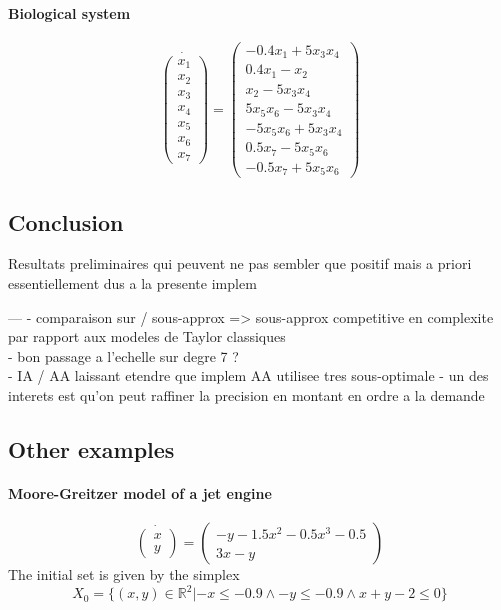 \documentclass{sig-alternate-05-2015} %
\newcommand\ForAuthors[1]%
 {\par\smallskip                     %
  \begin{center}%
   \fbox%
   {\parbox{0.9\linewidth}%
    {\raggedright\sc--- #1}%
   }%
  \end{center}%
  \par\smallskip                     %
 }
\def\R{{\mathbb R}}
\begin{document}
\paragraph{Biological system}


\begin{equation}
\dot{\left(\begin{array}{c}
x_1 \\
x_2 \\
x_3 \\
x_4 \\
x_5 \\
x_6 \\
x_7
\end{array}\right)} = \left(\begin{array}{c}
-0.4x_1+5x_3x_4 \\
0.4x_1-x_2 \\
x_2-5x_3x_4 \\
5x_5x_6-5x_3x_4 \\
-5x_5x_6+5x_3x_4 \\
0.5x_7-5x_5x_6 \\
-0.5x_7+5x_5x_6
\end{array}\right)
\end{equation}

\subsection{Conclusion}
Resultats preliminaires qui peuvent ne pas sembler que positif mais a priori essentiellement dus a la presente implem
\ForAuthors{
- comparaison sur / sous-approx => sous-approx competitive en complexite par rapport aux modeles de Taylor classiques\\
- bon passage a l'echelle sur degre 7 ? \\
- IA / AA laissant etendre que implem AA utilisee tres sous-optimale
- un des interets est qu'on peut raffiner la precision en montant en ordre a la demande
}

\subsection{Other examples}
\paragraph{Moore-Greitzer model of a jet engine}
\begin{equation}
\dot{\left(\begin{array}{c}
x \\
y
\end{array}\right)} = \left(\begin{array}{c}
-y-1.5x^2-0.5x^3-0.5 \\
3x-y
\end{array}\right)
\end{equation}
The initial set is given by the simplex 
$$X_0=\{(x,y) \in \R^2 | -x \leq -0.9 \wedge -y \leq -0.9\wedge x+y-2 \leq 0\}$$
\end{document}

